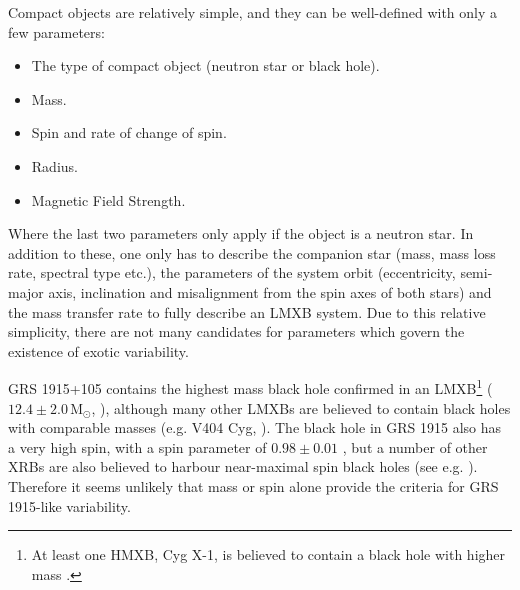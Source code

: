 \par Compact objects are relatively simple, and they can be well-defined with only a few parameters:

\begin{itemize}
\item The type of compact object (neutron star or black hole).
\item Mass.
\item Spin and rate of change of spin.
\item Radius.
\item Magnetic Field Strength.
\end{itemize}

Where the last two parameters only apply if the object is a neutron star.  In addition to these, one only has to describe the companion star (mass, mass loss rate, spectral type etc.), the parameters of the system orbit (eccentricity, semi-major axis, inclination and misalignment from the spin axes of both stars) and the mass transfer rate to fully describe an LMXB system.  Due to this relative simplicity, there are not many candidates for parameters which govern the existence of exotic variability.
\par GRS 1915+105 contains the highest mass black hole confirmed in an LMXB\footnote{At least one HMXB, Cyg X-1, is believed to contain a black hole with higher mass \citep{Orosz_CygX1}.} ($12.4\pm2.0$\,M$_\odot$, \citealp{Reid_Parallax}), although many other LMXBs are believed to contain black holes with comparable masses (e.g. V404 Cyg, \citealp{Shahbaz_V404}).  The black hole in GRS 1915 also has a very high spin, with a spin parameter of $0.98\pm0.01$ \citep{Miller_GRSspin}, but a number of other XRBs are also believed to harbour near-maximal spin black holes (see e.g. \citealp{Fragos_spin}).  Therefore it seems unlikely that mass or spin alone provide the criteria for GRS 1915-like variability.%
